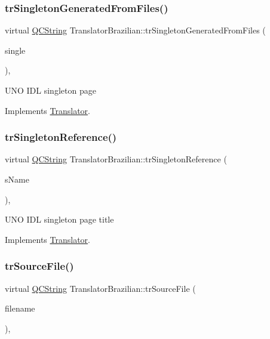\subsubsection{\texorpdfstring{trSingletonGeneratedFromFiles()}{trSingletonGeneratedFromFiles()}}
{\footnotesize\ttfamily virtual \mbox{\hyperlink{class_q_c_string}{Q\+C\+String}} Translator\+Brazilian\+::tr\+Singleton\+Generated\+From\+Files (\begin{DoxyParamCaption}\item[{bool}]{single }\end{DoxyParamCaption})\hspace{0.3cm}{\ttfamily [inline]}, {\ttfamily [virtual]}}

U\+NO I\+DL singleton page 

Implements \mbox{\hyperlink{class_translator}{Translator}}.

\mbox{\label{class_translator_brazilian_a3208b6bc387352fe8ae53116e9c667db}} 
\subsubsection{\texorpdfstring{trSingletonReference()}{trSingletonReference()}}
{\footnotesize\ttfamily virtual \mbox{\hyperlink{class_q_c_string}{Q\+C\+String}} Translator\+Brazilian\+::tr\+Singleton\+Reference (\begin{DoxyParamCaption}\item[{const char $\ast$}]{s\+Name }\end{DoxyParamCaption})\hspace{0.3cm}{\ttfamily [inline]}, {\ttfamily [virtual]}}

U\+NO I\+DL singleton page title 

Implements \mbox{\hyperlink{class_translator}{Translator}}.

\mbox{\label{class_translator_brazilian_a4d63f5e82921b0378dbb744b44f95198}} 
\subsubsection{\texorpdfstring{trSourceFile()}{trSourceFile()}}
{\footnotesize\ttfamily virtual \mbox{\hyperlink{class_q_c_string}{Q\+C\+String}} Translator\+Brazilian\+::tr\+Source\+File (\begin{DoxyParamCaption}\item[{\mbox{\hyperlink{class_q_c_string}{Q\+C\+String}} \&}]{filename }\end{DoxyParamCaption})\hspace{0.3cm}{\ttfamily [inline]}, {\ttfamily [virtual]}}

